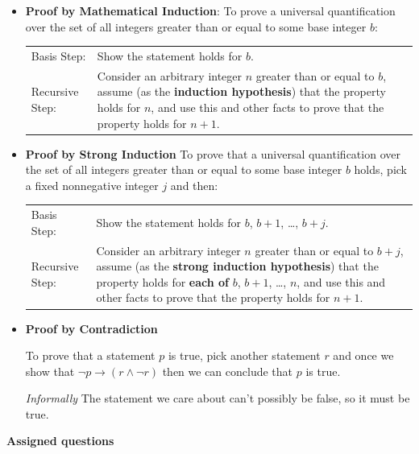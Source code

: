 \documentclass[12pt, oneside]{article}
\begin{document}
\begin{itemize}
    \item {\bf Proof by Mathematical Induction}: To prove a universal quantification over the set of  all integers greater than  or  equal to some base integer $b$:
    
    \begin{tabularx}{\textwidth}{l X}
        Basis Step: & Show the statement holds for $b$. \\
        Recursive Step: & Consider an arbitrary integer $n$ greater than or  equal to  $b$, assume
        (as the {\bf induction hypothesis})  that the property holds  for $n$, and use  this and
        other facts to  prove that  the property holds for $n+1$.
    \end{tabularx}
    
    \item {\bf Proof by Strong Induction} To prove that a universal quantification over the set of all integers greater than or equal to some  base integer $b$ holds,  pick a  fixed nonnegative integer  $j$ and then: \hfill 
    
    \begin{tabularx}{\textwidth}{l X}
        Basis Step: & Show the statement holds for $b$, $b+1$, \ldots, $b+j$. \\
        Recursive Step: & Consider an arbitrary integer $n$ greater than or  equal to  $b+j$, assume
        (as the {\bf strong  induction hypothesis})  that the property holds  for {\bf each of} $b$, $b+1$, \ldots, $n$, 	
        and use  this and
        other facts to  prove that  the property holds for $n+1$.
    \end{tabularx}

    \item {\bf Proof by Contradiction} 

    To prove that a statement $p$ is true, pick another statement $r$ and once we show
    that $\neg p  \to (r \wedge  \neg r)$ then  we can conclude that  $p$ is  true.
    
    {\it Informally} The statement we care about can't possibly be false, so it must be true.
\end{itemize}


{\bf Assigned questions}
\end{document}
